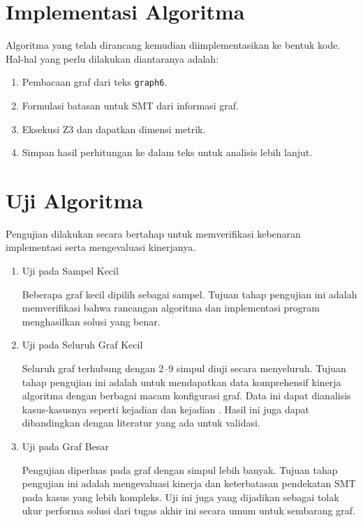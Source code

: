 \section{Implementasi Algoritma}

Algoritma yang telah dirancang kemudian diimplementasikan ke bentuk kode. Hal-hal yang perlu dilakukan diantaranya adalah:

\begin{enumerate}

		\item Pembacaan graf dari  teks \verb`graph6`.

		\item Formulasi batasan untuk SMT dari informasi graf.

		\item Eksekusi Z3  dan dapatkan dimensi metrik.

		\item Simpan hasil perhitungan ke dalam  teks untuk analisis lebih lanjut.

\end{enumerate}

\section{Uji Algoritma}

Pengujian dilakukan secara bertahap untuk memverifikasi kebenaran implementasi serta mengevaluasi kinerjanya.

\begin{enumerate}

	\item{Uji pada Sampel Kecil}

	Beberapa graf kecil dipilih sebagai sampel. Tujuan tahap pengujian ini adalah memverifikasi bahwa rancangan algoritma dan implementasi program menghasilkan solusi yang benar.

	\item{Uji pada Seluruh Graf Kecil}

	Seluruh graf terhubung dengan 2–9 simpul diuji secara menyeluruh. Tujuan tahap pengujian ini adalah untuk mendapatkan data komprehensif kinerja algoritma dengan berbagai macam konfigurasi graf. Data ini dapat dianalisis kasus-kasusnya seperti kejadian  dan kejadian . Hasil ini juga dapat dibandingkan dengan literatur yang ada untuk validasi.

	\item{Uji pada Graf Besar}

	Pengujian diperluas pada graf dengan simpul lebih banyak. Tujuan tahap pengujian ini adalah mengevaluasi kinerja dan keterbatasan pendekatan SMT pada kasus yang lebih kompleks. Uji ini juga yang dijadikan sebagai tolak ukur performa solusi dari tugas akhir ini secara umum untuk sembarang graf.

\end{enumerate}

